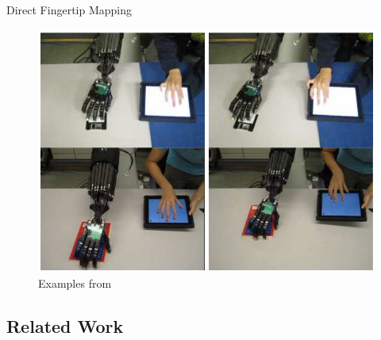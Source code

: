 \documentclass[t]{beamer}
\begin{document}
\begin{frame}{Direct Fingertip Mapping}
\begin{figure}
	\includegraphics[height=0.6\textheight]{assets/pres/dftm_toh.PNG}
	\caption{Examples from \citeauthor{conf:humanoids:TohHLBZP12}\cite{conf:humanoids:TohHLBZP12}}
\end{figure}
\end{frame}

\subsection{Related Work}
\end{document}
